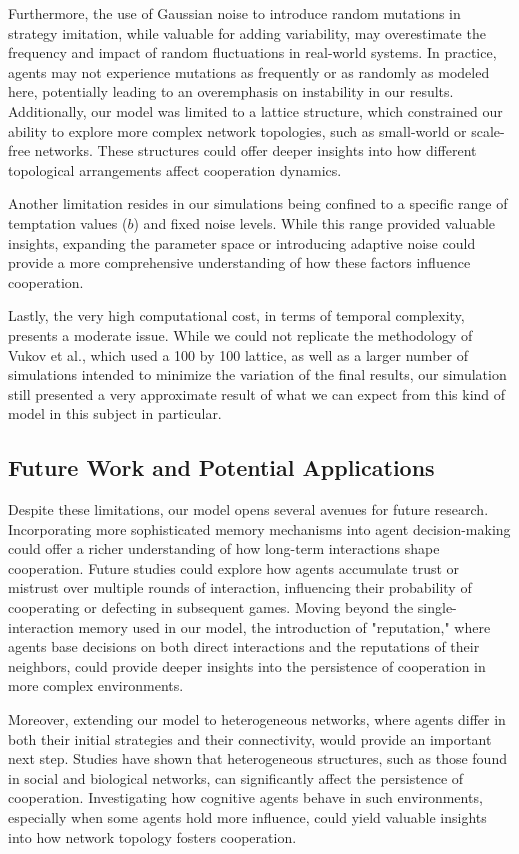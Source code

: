 \documentclass[runningheads]{llncs}
\begin{document}
Furthermore, the use of Gaussian noise to introduce random mutations in strategy imitation, while valuable for adding variability, may overestimate the frequency and impact of random fluctuations in real-world systems. In practice, agents may not experience mutations as frequently or as randomly as modeled here, potentially leading to an overemphasis on instability in our results. Additionally, our model was limited to a lattice structure, which constrained our ability to explore more complex network topologies, such as small-world or scale-free networks. These structures could offer deeper insights into how different topological arrangements affect cooperation dynamics.

Another limitation resides in our simulations being confined to a specific range of temptation values (\( b \)) and fixed noise levels. While this range provided valuable insights, expanding the parameter space or introducing adaptive noise could provide a more comprehensive understanding of how these factors influence cooperation.

Lastly, the very high computational cost, in terms of temporal complexity, presents
a moderate issue. While we could not replicate the methodology of Vukov et al.,
which used a 100 by 100 lattice, as well as a larger number of simulations intended
to minimize the variation of the final results, our simulation still presented
a very approximate result of what we can expect from this kind of model in this
subject in particular.

\subsection{Future Work and Potential Applications}
Despite these limitations, our model opens several avenues for future research. Incorporating more sophisticated memory mechanisms into agent decision-making could offer a richer understanding of how long-term interactions shape cooperation. Future studies could explore how agents accumulate trust or mistrust over multiple rounds of interaction, influencing their probability of cooperating or defecting in subsequent games. Moving beyond the single-interaction memory used in our model, the introduction of "reputation," where agents base decisions on both direct interactions and the reputations of their neighbors, could provide deeper insights into the persistence of cooperation in more complex environments.

Moreover, extending our model to heterogeneous networks, where agents differ in both their initial strategies and their connectivity, would provide an important next step. Studies have shown that heterogeneous structures, such as those found in social and biological networks, can significantly affect the persistence of cooperation. Investigating how cognitive agents behave in such environments, especially when some agents hold more influence, could yield valuable insights into how network topology fosters cooperation.
\end{document}
